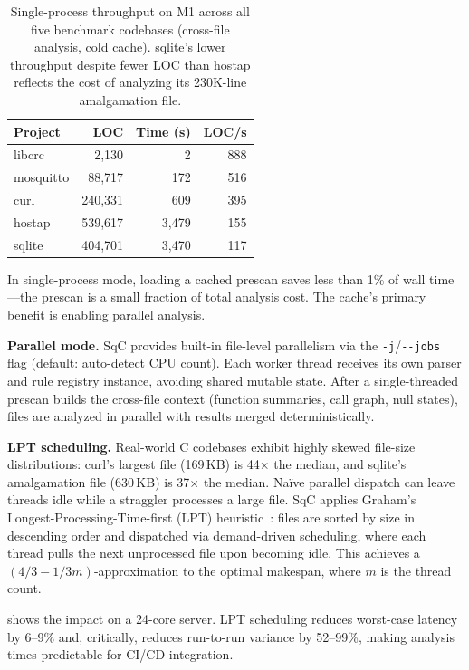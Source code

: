 \documentclass[10pt,twocolumn,letterpaper]{article}
\begin{document}
\begin{table}[t]
\centering
\footnotesize
\begin{tabular}{@{}lrrr@{}}
\toprule
\textbf{Project} & \textbf{LOC} & \textbf{Time (s)} & \textbf{LOC/s} \\
\midrule
libcrc    &   2{,}130 &     2 &   888 \\
mosquitto &  88{,}717 &   172 &   516 \\
curl      & 240{,}331 &   609 &   395 \\
hostap    & 539{,}617 & 3{,}479 & 155 \\
sqlite    & 404{,}701 & 3{,}470 & 117 \\
\bottomrule
\end{tabular}
\caption{Single-process throughput on M1 across all five benchmark
codebases (cross-file analysis, cold cache).  sqlite's lower
throughput despite fewer LOC than hostap reflects the cost of
analyzing its 230K-line amalgamation file.}
\label{tab:runtime-scaling}
\end{table}

In single-process mode, loading a cached prescan saves less than 1\%
of wall time---the prescan is a small fraction of total analysis cost.
The cache's primary benefit is enabling parallel analysis.

\textbf{Parallel mode.}  SqC provides built-in file-level parallelism
via the \texttt{-j}/\texttt{-{}-jobs} flag (default: auto-detect CPU
count).  Each worker thread receives its own parser and rule registry
instance, avoiding shared mutable state.  After a single-threaded
prescan builds the cross-file context (function summaries, call graph,
null states), files are analyzed in parallel with results merged
deterministically.

\textbf{LPT scheduling.}  Real-world C codebases exhibit highly skewed
file-size distributions: curl's largest file (169\,KB) is 44$\times$
the median, and sqlite's amalgamation file (630\,KB) is 37$\times$ the
median.  Na\"ive parallel dispatch can leave threads idle while a
straggler processes a large file.  SqC applies Graham's
Longest-Processing-Time-first (LPT) heuristic~\cite{graham-lpt}: files
are sorted by size in descending order and dispatched via demand-driven
scheduling, where each thread pulls the next unprocessed file upon
becoming idle.  This achieves a $(4/3 - 1/3m)$-approximation to the
optimal makespan, where $m$ is the thread count.

 shows the impact on a 24-core server.  LPT
scheduling reduces worst-case latency by 6--9\% and, critically,
reduces run-to-run variance by 52--99\%, making analysis times
predictable for CI/CD integration.
\end{document}
